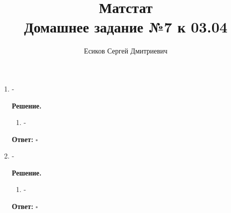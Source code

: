 \documentclass[12pt]{article}
\title{\textbf{Матстат}\\Домашнее задание №7 к 03.04}
\author{Есиков Сергей Дмитриевич}
\newenvironment{solution}{\textbf{Решение.}\par}{\hfill\(\square\)}
\newcommand{\answer}[1]{\textbf{Ответ:} \boxed{#1}}
\begin{document}
\maketitle

\begin{enumerate}[label=\textbf{\arabic*.}, left=0pt]
    \item -
          
    \begin{solution}
              \begin{enumerate}
                  \item -
              \end{enumerate}
              \answer{-}
          \end{solution}
    
    \item -
          
    \begin{solution}
              \begin{enumerate}
                  \item -
              \end{enumerate}
              \answer{-}
          \end{solution}
\end{enumerate}
\end{document}
